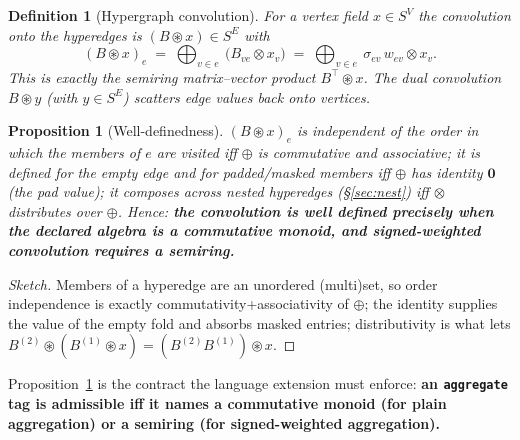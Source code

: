 \documentclass[11pt]{article}
\newtheorem{definition}{Definition}
\newtheorem{proposition}{Proposition}
\begin{document}
\begin{definition}[Hypergraph convolution]
For a vertex field $x\in S^V$ the convolution onto the hyperedges is $(B\circledast x)\in S^E$ with
\[
(B\circledast x)_e \;=\; \bigoplus_{v\in e}\ \big(B_{ve}\otimes x_v\big)
\;=\; \bigoplus_{v\in e}\ \sigma_{ev}\,w_{ev}\otimes x_v .
\]
This is exactly the semiring matrix--vector product $B^{\!\top}\!\circledast x$. The dual convolution
$B\circledast y$ (with $y\in S^E$) scatters edge values back onto vertices.
\end{definition}

\begin{proposition}[Well-definedness]\label{prop:wd}
$(B\circledast x)_e$ is independent of the order in which the members of $e$ are visited \emph{iff} $\oplus$ is
commutative and associative; it is defined for the empty edge and for padded/masked members \emph{iff} $\oplus$
has identity $\mathbf 0$ (the pad value); it composes across nested hyperedges (\S\ref{sec:nest}) \emph{iff}
$\otimes$ distributes over $\oplus$. Hence: \textbf{the convolution is well defined precisely when the declared
algebra is a commutative monoid, and signed-weighted convolution requires a semiring.}
\end{proposition}
\begin{proof}[Sketch] Members of a hyperedge are an unordered (multi)set, so order independence is exactly
commutativity+associativity of $\oplus$; the identity supplies the value of the empty fold and absorbs masked
entries; distributivity is what lets $B^{(2)}\!\circledast(B^{(1)}\!\circledast x)=(B^{(2)}B^{(1)})\circledast x$.
\end{proof}

Proposition~\ref{prop:wd} is the contract the language extension must enforce: \textbf{an \texttt{aggregate} tag
is admissible iff it names a commutative monoid (for plain aggregation) or a semiring (for signed-weighted
aggregation).}
\end{document}
